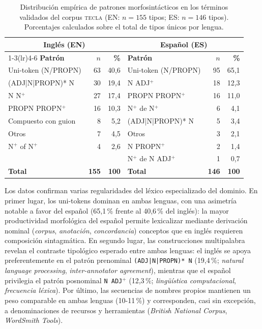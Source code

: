 \begin{table}[H]
\centering
\small
\setlength{\tabcolsep}{4pt}
\renewcommand{\arraystretch}{1.15}
\caption{Distribución empírica de patrones morfosintácticos en los términos
  validados del corpus \textsc{tecla} (EN: $n=155$ tipos; ES: $n=146$ tipos).
  Porcentajes calculados sobre el total de tipos únicos por lengua.}
\label{tab:patrones_pos}
\begin{tabular}{@{} l r r @{\quad} l r r @{}}
\toprule
\multicolumn{3}{c}{\textbf{Inglés (EN)}} & \multicolumn{3}{c}{\textbf{Español (ES)}} \\
\cmidrule(lr){1-3}\cmidrule(lr){4-6}
\textbf{Patrón} & \textbf{$n$} & \textbf{\%} &
\textbf{Patrón} & \textbf{$n$} & \textbf{\%} \\
\midrule
Uni-token (N/PROPN)      & 63 & 40{,}6 & Uni-token (N/PROPN)   & 95 & 65{,}1 \\
(ADJ|N|PROPN)* N         & 30 & 19{,}4 & N ADJ$^{+}$           & 18 & 12{,}3 \\
N N$^{+}$                & 27 & 17{,}4 & PROPN PROPN$^{+}$     & 16 & 11{,}0 \\
PROPN PROPN$^{+}$        & 16 & 10{,}3 & N$^{+}$ de N$^{+}$    &  6 &  4{,}1 \\
Compuesto con guion      &  8 &  5{,}2 & (ADJ|N|PROPN)* N      &  5 &  3{,}4 \\
Otros                    &  7 &  4{,}5 & Otros                 &  3 &  2{,}1 \\
N$^{+}$ of N$^{+}$       &  4 &  2{,}6 & N PROPN$^{+}$         &  2 &  1{,}4 \\
                         &    &        & N$^{+}$ de N ADJ$^{+}$&  1 &  0{,}7 \\
\midrule
\textbf{Total}           & \textbf{155} & \textbf{100} &
\textbf{Total}           & \textbf{146} & \textbf{100} \\
\bottomrule
\end{tabular}
\end{table}

Los datos confirman varias regularidades del léxico especializado del dominio.
En primer lugar, los uni-tokens dominan en ambas lenguas, con una asimetría
notable a favor del español (65,1\,\% frente al 40,6\,\% del inglés): la
mayor productividad morfológica del español permite lexicalizar mediante
derivación nominal (\textit{corpus}, \textit{anotación}, \textit{concordancia})
conceptos que en inglés requieren composición sintagmática. En segundo
lugar, las construcciones multipalabra revelan el contraste tipológico
esperado entre ambas lenguas: el inglés se apoya preferentemente en el
patrón prenominal \texttt{(ADJ|N|PROPN)* N} (19,4\,\%; \textit{natural
language processing}, \textit{inter-annotator agreement}), mientras que el
español privilegia el patrón posnominal \texttt{N ADJ}$^{+}$ (12,3\,\%;
\textit{lingüística computacional}, \textit{frecuencia léxica}). Por último,
las secuencias de nombres propios mantienen un peso comparable en ambas
lenguas (10-11\,\%) y corresponden, casi sin excepción, a denominaciones de
recursos y herramientas (\textit{British National Corpus},
\textit{WordSmith Tools}).

